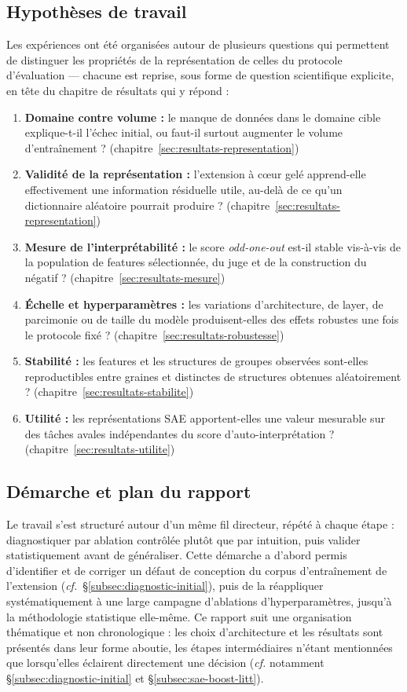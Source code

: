 \documentclass[11pt]{article}
\begin{document}
\subsection{Hypothèses de travail}

Les expériences ont été organisées autour de plusieurs questions qui permettent de
distinguer les propriétés de la représentation de celles du protocole d'évaluation ---
chacune est reprise, sous forme de question scientifique explicite, en tête du
chapitre de résultats qui y répond :
\begin{enumerate}
  \item \textbf{Domaine contre volume :} le manque de données dans le domaine cible
  explique-t-il l'échec initial, ou faut-il surtout augmenter le volume d'entraînement ?
  (chapitre~\ref{sec:resultats-representation})
  \item \textbf{Validité de la représentation :} l'extension à cœur gelé apprend-elle
  effectivement une information résiduelle utile, au-delà de ce qu'un dictionnaire
  aléatoire pourrait produire ? (chapitre~\ref{sec:resultats-representation})
  \item \textbf{Mesure de l'interprétabilité :} le score \emph{odd-one-out} est-il
  stable vis-à-vis de la population de features sélectionnée, du juge et de la
  construction du négatif ? (chapitre~\ref{sec:resultats-mesure})
  \item \textbf{Échelle et hyperparamètres :} les variations d'architecture, de layer,
  de parcimonie ou de taille du modèle produisent-elles des effets robustes une fois
  le protocole fixé ? (chapitre~\ref{sec:resultats-robustesse})
  \item \textbf{Stabilité :} les features et les structures de groupes observées sont-elles
  reproductibles entre graines et distinctes de structures obtenues aléatoirement ?
  (chapitre~\ref{sec:resultats-stabilite})
  \item \textbf{Utilité :} les représentations SAE apportent-elles une valeur mesurable
  sur des tâches avales indépendantes du score d'auto-interprétation ?
  (chapitre~\ref{sec:resultats-utilite})
\end{enumerate}

\subsection{Démarche et plan du rapport}

Le travail
s'est structuré autour d'un même fil directeur, répété à chaque étape :
diagnostiquer par ablation contrôlée plutôt que par intuition, puis valider
statistiquement avant de généraliser. Cette démarche a d'abord permis
d'identifier et de corriger un défaut de conception du corpus d'entraînement
de l'extension (\emph{cf.}~\S\ref{subsec:diagnostic-initial}), puis de la
réappliquer systématiquement à une large campagne d'ablations
d'hyperparamètres, jusqu'à la méthodologie statistique elle-même. Ce rapport suit une organisation thématique et non
chronologique : les choix d'architecture et les résultats sont présentés dans
leur forme aboutie, les étapes intermédiaires n'étant mentionnées que
lorsqu'elles éclairent directement une décision (\emph{cf.} notamment
\S\ref{subsec:diagnostic-initial} et \S\ref{subsec:sae-boost-litt}).
\end{document}
